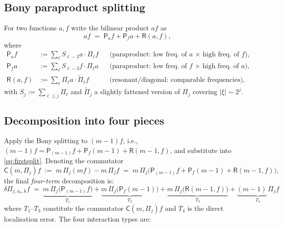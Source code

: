 \documentclass[11pt,a4paper]{article}
\newcommand{\para}{\mathsf{P}}     %
\newcommand{\comm}{\mathsf{C}}     %
\newcommand{\res}{\mathsf{R}}      %
\begin{document}
\subsection{Bony paraproduct splitting}

For two functions $a, f$ write the bilinear product $af$ as
\[
  af \;=\; \para_a f + \para_f a + \res(a,f),
\]
where
\begin{align*}
  \para_a f &:= \sum_{\ell} S_{\ell-3} a \cdot \Pi_\ell f
             & &\text{(paraproduct: low freq.\ of $a$ × high freq.\ of $f$)},\\
  \para_f a &:= \sum_{\ell} S_{\ell-3} f \cdot \Pi_\ell a
             & &\text{(paraproduct: low freq.\ of $f$ × high freq.\ of $a$)},\\
  \res(a,f) &:= \sum_{\ell} \Pi_\ell a \cdot \widetilde\Pi_\ell f
             & &\text{(resonant/diagonal: comparable frequencies)},
\end{align*}
with $S_j := \sum_{\ell \leq j} \Pi_\ell$ and $\widetilde\Pi_j$ a slightly
fattened version of $\Pi_j$ covering $|\xi| \sim 2^j$.

\subsection{Decomposition into four pieces}

Apply the Bony splitting to $(m-1)f$, i.e.,
$(m-1)f = \para_{(m-1)} f + \para_f(m-1) + \res(m-1,f)$,
and substitute into \eqref{eq:firstsplit}.  Denoting the commutator
\[
  \comm(m,\Pi_j)f \;:=\; m\,\Pi_j(m f) - m\,\Pi_j f
  \;=\; m\,\Pi_j\bigl(\para_{(m-1)} f
        + \para_f(m-1) + \res(m-1,f)\bigr),
\]
the final \emph{four-term} decomposition is:
\begin{equation}
  \label{eq:main}
  \boxed{
  \delta\Pi_{j,x_0,k} f
  \;=\;
  \underbrace{m\,\Pi_j\!\bigl(\para_{(m-1)} f\bigr)}_{\displaystyle T_1}
  +\underbrace{m\,\Pi_j\!\bigl(\para_f(m-1)\bigr)}_{\displaystyle T_2}
  +\underbrace{m\,\Pi_j\!\bigl(\res(m-1,f)\bigr)}_{\displaystyle T_3}
  +\underbrace{(m-1)\,\Pi_j f}_{\displaystyle T_4}
  }
\end{equation}
where $T_1$--$T_3$ constitute the commutator $\comm(m,\Pi_j)f$ and $T_4$
is the direct localisation error.  The four interaction types are:
\end{document}
